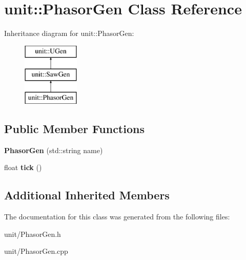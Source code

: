 \hypertarget{classunit_1_1PhasorGen}{}\section{unit\+:\+:Phasor\+Gen Class Reference}
\label{classunit_1_1PhasorGen}
Inheritance diagram for unit\+:\+:Phasor\+Gen\+:\begin{figure}[H]
\begin{center}
\leavevmode
\includegraphics[height=3.000000cm]{classunit_1_1PhasorGen}
\end{center}
\end{figure}
\subsection*{Public Member Functions}
\begin{DoxyCompactItemize}
\item 
{\bfseries Phasor\+Gen} (std\+::string name)\hypertarget{classunit_1_1PhasorGen_a726fab6730e45d7fbf242f4613837e28}{}\label{classunit_1_1PhasorGen_a726fab6730e45d7fbf242f4613837e28}

\item 
float {\bfseries tick} ()\hypertarget{classunit_1_1PhasorGen_a056953090628af9868e4778d15daf79a}{}\label{classunit_1_1PhasorGen_a056953090628af9868e4778d15daf79a}

\end{DoxyCompactItemize}
\subsection*{Additional Inherited Members}


The documentation for this class was generated from the following files\+:\begin{DoxyCompactItemize}
\item 
unit/Phasor\+Gen.\+h\item 
unit/Phasor\+Gen.\+cpp\end{DoxyCompactItemize}
